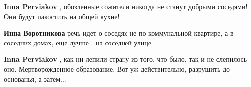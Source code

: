 \begin{itemize}
\begin{itemize}
\textbf{Inna Perviakov} , обозленные сожители никогда не станут добрыми соседями! Они будут пакостить на общей кухне! 🤯

 
\textbf{Инна Воротникова} речь идет о соседях не по коммунальной квартире, а в соседних домах, еще лучше - на соседней улице

 
\textbf{Inna Perviakov} , как ни лепили страну из того, что было, так и не слепилось оно.
Мертворожденное образование. Вот уж действительно, разрушить до основанья, а затем...
\end{itemize}


\end{itemize}

